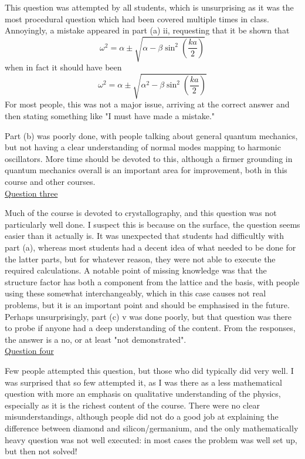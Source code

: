 \documentclass[12pt,a4paper]{article}
\newcommand{\ul}[1]{\underline{#1}}
\begin{document}
\begin{answer}
				This question was attempted by all students, which is unsurprising as it was the most procedural question which had been covered multiple times in class. Annoyingly, a mistake appeared in part (a) ii, requesting that it be shown that
				$$ \omega^2 = \alpha \pm \sqrt{\alpha - \beta \sin^2 \left(\frac{ka}{2}\right)} $$
				when in fact it should have been
				$$ \omega^2 = \alpha \pm \sqrt{\alpha^2 - \beta \sin^2 \left(\frac{ka}{2}\right)} $$
				For most people, this was not a major issue, arriving at the correct answer and then stating something like "I must have made a mistake."

				Part (b) was poorly done, with people talking about general quantum mechanics, but not having a clear understanding of normal modes mapping to harmonic oscillators. More time should be devoted to this, although a firmer grounding in quantum mechanics overall is an important area for improvement, both in this course and other courses. \\

				\noindent \ul{Question three}

				Much of the course is devoted to crystallography, and this question was not particularly well done. I suspect this is because on the surface, the question seems easier than it actually is. It was unexpected that students had difficultly with part (a), whereas most students had a decent idea of what needed to be done for the latter parts, but for whatever reason, they were not able to execute the required calculations. A notable point of missing knowledge was that the structure factor has both a component from the lattice and the basis, with people using these somewhat interchangeably, which in this case causes not real problems, but it is an important point and should be emphasised in the future. Perhaps unsurprisingly, part (c) v was done poorly, but that question was there to probe if anyone had a deep understanding of the content. From the responses, the answer is a no, or at least "not demonstrated". \\

				\noindent \ul{Question four}

				Few people attempted this question, but those who did typically did very well. I was surprised that so few attempted it, as I was there as a less mathematical question with more an emphasis on qualitative understanding of the physics, especially as it is the richest content of the course. There were no clear misunderstandings, although people did not do a good job at explaining the difference between diamond and silicon/germanium, and the only mathematically heavy question was not well executed: in most cases the problem was well set up, but then not solved!

			\end{answer}
\end{document}
